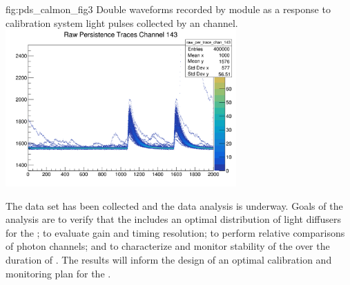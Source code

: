 \begin{dunefigure}
 {fig:pds_calmon_fig3}
 {Double waveforms recorded by   module as a response to calibration system light pulses collected by an  channel.}
\includegraphics[height=6cm]{graphics/pds-calmon-example.png}
\end{dunefigure}

The  data set has been collected and the data analysis is underway.
Goals of the analysis are to verify that the  includes %
an optimal distribution of light diffusers for the ;  %
to evaluate gain and timing resolution; to perform relative comparisons of photon channels;
and to characterize and monitor stability of the  over the duration of . The results will inform the design of an optimal
 calibration and monitoring plan for the .%






